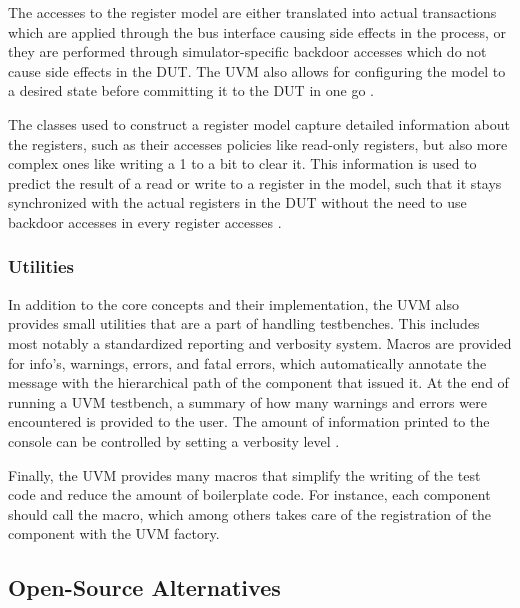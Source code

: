 The accesses to the register model are either translated into actual transactions which are applied through the bus
interface causing side effects in the process, or they are performed through simulator-specific backdoor accesses
which do not cause side effects in the DUT. The UVM also allows for configuring the model to a desired state before
committing it to the DUT in one go \cite{uvm_ral}.

The classes used to construct a register model capture detailed information about the registers, such as
their accesses policies like read-only registers, but also more complex ones like writing a 1 to a bit to clear it.
This information is used to predict the result of a read or write to a register in the model, such that it stays
synchronized with the actual registers in the DUT without the need to use backdoor accesses in every register
accesses \cite{uvm_ral}.

\subsubsection{Utilities} %

In addition to the core concepts and their implementation, the UVM also provides small utilities that are a part of
handling testbenches. This includes most notably a standardized reporting and verbosity system. Macros are provided
for info's, warnings, errors, and fatal errors, which automatically annotate the message with the hierarchical path of
the component that issued it. At the end of running a UVM testbench, a summary of how many warnings and errors were
encountered is
provided to the user. The amount of information printed to the console can be controlled by setting a verbosity level
\cite[Ch. 19]{salemi2013uvm}.

Finally, the UVM provides many macros that simplify the writing of the test code and reduce the amount of
boilerplate code. For instance, each component should call the  macro, which among
others takes care of the registration of the component with the UVM factory.

\subsection{Open-Source Alternatives} %

